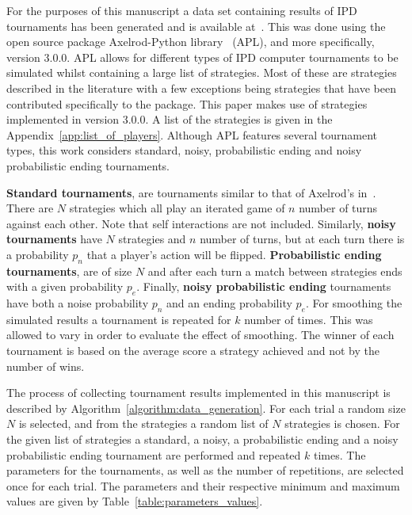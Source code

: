 \documentclass{article}
\newcommand{\numberofstrategies}{}
\begin{document}
For the purposes of this manuscript a data set containing results of IPD
tournaments has been generated and is available at~\cite{data}. This was done using the
open source package Axelrod-Python library~\cite{axelrodproject} (APL), and more specifically,
version 3.0.0. APL allows for different types of IPD computer
tournaments to be simulated whilst containing a large list of strategies.
Most of these are strategies described in the literature with a few exceptions
being strategies that have been contributed specifically to the package. This
paper makes use of \numberofstrategies strategies implemented in version 3.0.0. A
list of the strategies is given in the Appendix~\ref{app:list_of_players}.
Although APL features several tournament types, this work considers
standard, noisy, probabilistic ending and noisy probabilistic ending
tournaments.

\textbf{Standard tournaments}, are tournaments similar to that of Axelrod's
in~\cite{Axelrod1980a}. There are \(N\) strategies which all play an iterated
game of \(n\) number of turns against each other. Note that self interactions
are not included. Similarly, \textbf{noisy
tournaments} have \(N\) strategies and \(n\) number of turns, but at each turn
there is a probability \(p_n\) that a player's action will be flipped.
\textbf{Probabilistic ending tournaments}, are of size \(N\) and after each turn
a match between strategies ends with a given probability \(p_e\). Finally,
\textbf{noisy probabilistic ending} tournaments have both a noise probability
\(p_n\) and an ending probability \(p_e\). For smoothing the simulated results a
tournament is repeated for \(k\) number of times. This was allowed to vary 
in order to evaluate the effect of smoothing. The winner of each tournament
is based on the average score a strategy achieved and not by the number of wins.

The process of collecting tournament results implemented in this manuscript is described by
Algorithm~\ref{algorithm:data_generation}. For each trial a random size \(N\) is
selected, and from the \numberofstrategies strategies a random list of \(N\) strategies is
chosen. For the given list of strategies a standard, a noisy, a probabilistic
ending and a noisy probabilistic ending tournament are performed and repeated
\(k\) times. The parameters for the tournaments, as well as the number of
repetitions, are selected once for each trial. The parameters and their
respective minimum and maximum values are given by
Table~\ref{table:parameters_values}.
\end{document}
